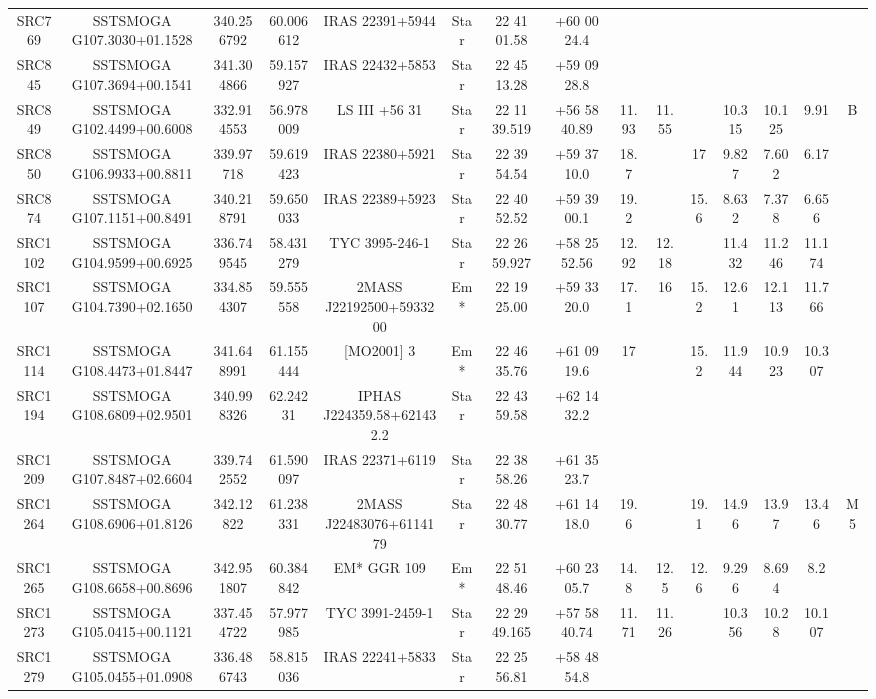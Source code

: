 \begin{table}
\begin{tabular}{ccccccccccccccc}
SRC769 & SSTSMOGA G107.3030+01.1528 & 340.256792 & 60.006612 & IRAS 22391+5944 & Star & 22 41 01.58 & +60 00 24.4 &  &  &  &  &  &  &  \\
SRC845 & SSTSMOGA G107.3694+00.1541 & 341.304866 & 59.157927 & IRAS 22432+5853 & Star & 22 45 13.28 & +59 09 28.8 &  &  &  &  &  &  &  \\
SRC849 & SSTSMOGA G102.4499+00.6008 & 332.914553 & 56.978009 & LS III +56   31 & Star & 22 11 39.519 & +56 58 40.89 & 11.93 & 11.55 &  & 10.315 & 10.125 & 9.91 & B \\
SRC850 & SSTSMOGA G106.9933+00.8811 & 339.97718 & 59.619423 & IRAS 22380+5921 & Star & 22 39 54.54 & +59 37 10.0 & 18.7 &  & 17 & 9.827 & 7.602 & 6.17 &  \\
SRC874 & SSTSMOGA G107.1151+00.8491 & 340.218791 & 59.650033 & IRAS 22389+5923 & Star & 22 40 52.52 & +59 39 00.1 & 19.2 &  & 15.6 & 8.632 & 7.378 & 6.656 &  \\
SRC1102 & SSTSMOGA G104.9599+00.6925 & 336.749545 & 58.431279 & TYC 3995-246-1 & Star & 22 26 59.927 & +58 25 52.56 & 12.92 & 12.18 &  & 11.432 & 11.246 & 11.174 &  \\
SRC1107 & SSTSMOGA G104.7390+02.1650 & 334.854307 & 59.555558 & 2MASS J22192500+5933200 & Em* & 22 19 25.00 & +59 33 20.0 & 17.1 & 16 & 15.2 & 12.61 & 12.113 & 11.766 &  \\
SRC1114 & SSTSMOGA G108.4473+01.8447 & 341.648991 & 61.155444 & [MO2001]   3 & Em* & 22 46 35.76 & +61 09 19.6 & 17 &  & 15.2 & 11.944 & 10.923 & 10.307 &  \\
SRC1194 & SSTSMOGA G108.6809+02.9501 & 340.998326 & 62.24231 & IPHAS J224359.58+621432.2 & Star & 22 43 59.58 & +62 14 32.2 &  &  &  &  &  &  &  \\
SRC1209 & SSTSMOGA G107.8487+02.6604 & 339.742552 & 61.590097 & IRAS 22371+6119 & Star & 22 38 58.26 & +61 35 23.7 &  &  &  &  &  &  &  \\
SRC1264 & SSTSMOGA G108.6906+01.8126 & 342.12822 & 61.238331 & 2MASS J22483076+6114179 & Star & 22 48 30.77 & +61 14 18.0 & 19.6 &  & 19.1 & 14.96 & 13.97 & 13.46 & M5 \\
SRC1265 & SSTSMOGA G108.6658+00.8696 & 342.951807 & 60.384842 & EM* GGR  109 & Em* & 22 51 48.46 & +60 23 05.7 & 14.8 & 12.5 & 12.6 & 9.296 & 8.694 & 8.2 &  \\
SRC1273 & SSTSMOGA G105.0415+00.1121 & 337.454722 & 57.977985 & TYC 3991-2459-1 & Star & 22 29 49.165 & +57 58 40.74 & 11.71 & 11.26 &  & 10.356 & 10.28 & 10.107 &  \\
SRC1279 & SSTSMOGA G105.0455+01.0908 & 336.486743 & 58.815036 & IRAS 22241+5833 & Star & 22 25 56.81 & +58 48 54.8 &  &  &  &  &  &  &  \\

\end{tabular}
\end{table}
